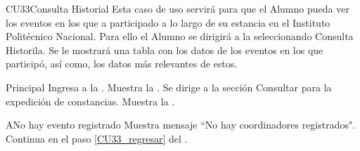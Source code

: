 \begin{UseCase}{CU33}{Consulta Historial}{
		\noindent Esta caso de uso servirá para que el Alumno pueda ver los eventos en los que a participado a lo largo de su estancia en el Instituto Politécnico Nacional.
		Para ello el Alumno se dirigirá a la  seleccionando Consulta Historila. Se le mostrará una tabla con los datos de los eventos en los que participó, así como, los datos más relevantes de estos.
	} \label{CU33_evento}

		\end{UseCase}
	
    \begin{UCtrayectoria}{Principal}
    \UCpaso[\UCactor] Ingresa a la .
    \UCpaso Muestra la . \label{CU33_regresar}
    \UCpaso[\UCactor] Se dirige a la sección Consultar para la expedición de constancias.  
    \UCpaso Muestra la . 
    \end{UCtrayectoria}
    
    \begin{UCtrayectoriaA}{A}{No hay evento registrado}
    	\UCpaso Muestra mensaje “No hay coordinadores registrados".
    	\UCpaso Continua en el paso \ref{CU33_regresar} del .
    \end{UCtrayectoriaA}


	


